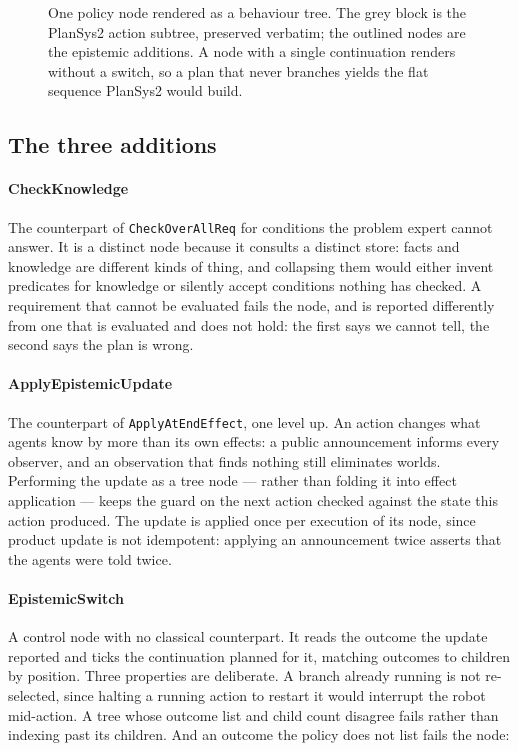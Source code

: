 \documentclass[11pt,a4paper]{article}
\theoremstyle{definition}
\newcommand{\Kw}[1]{\mathit{Kw}_{#1}}
\newcommand{\code}[1]{\texttt{\small #1}}
\begin{document}
\begin{figure}[H]
\caption{One policy node rendered as a behaviour tree. The grey block is the
PlanSys2 action subtree, preserved verbatim; the outlined nodes are the
epistemic additions. A node with a single continuation renders without a switch,
so a plan that never branches yields the flat sequence PlanSys2 would build.}
\label{fig:tree}
\end{figure}

\subsection{The three additions}

\paragraph{CheckKnowledge} The counterpart of \code{CheckOverAllReq} for
conditions the problem expert cannot answer. It is a distinct node because it
consults a distinct store: facts and knowledge are different kinds of thing, and
collapsing them would either invent predicates for knowledge or silently accept
conditions nothing has checked. A requirement that cannot be evaluated fails the
node, and is reported differently from one that is evaluated and does not hold:
the first says we cannot tell, the second says the plan is wrong.

\paragraph{ApplyEpistemicUpdate} The counterpart of \code{ApplyAtEndEffect}, one
level up. An action changes what agents know by more than its own effects: a
public announcement informs every observer, and an observation that finds nothing
still eliminates worlds. Performing the update as a tree node --- rather than
folding it into effect application --- keeps the guard on the next action checked
against the state this action produced. The update is applied once per execution
of its node, since product update is not idempotent: applying an announcement
twice asserts that the agents were told twice.

\paragraph{EpistemicSwitch} A control node with no classical counterpart. It
reads the outcome the update reported and ticks the continuation planned for it,
matching outcomes to children by position. Three properties are deliberate. A
branch already running is not re-selected, since halting a running action to
restart it would interrupt the robot mid-action. A tree whose outcome list and
child count disagree fails rather than indexing past its children. And an outcome
the policy does not list fails the node:
\end{document}
